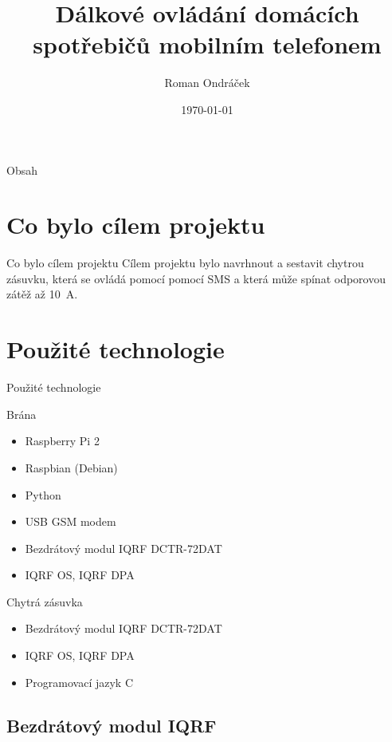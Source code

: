 \documentclass[11pt]{beamer}
\author{Roman Ondráček}
\title[Dálkové ovládání domácích spotřebičů]{Dálkové ovládání domácích spotřebičů mobilním telefonem}
\institute[]{Gymnázium Boskovice}
\date{\today}
\begin{document}
\begin{frame}
\titlepage
\end{frame}

\begin{frame}{Obsah}
\tableofcontents
\end{frame}

\section{Co bylo cílem projektu}

\begin{frame}{Co bylo cílem projektu}
Cílem projektu bylo navrhnout a sestavit chytrou zásuvku, která se ovládá pomocí pomocí SMS a která může spínat odporovou zátěž až 10~A.
\end{frame}

\section{Použité technologie}

\begin{frame}{Použité technologie}
  \begin{exampleblock}{Brána}
    \begin{itemize}
      \item Raspberry Pi 2
      \item Raspbian (Debian)
      \item Python
      \item USB GSM modem
      \item Bezdrátový modul IQRF DCTR-72DAT
      \item IQRF OS, IQRF DPA
    \end{itemize}
  \end{exampleblock}
  \begin{alertblock}{Chytrá zásuvka}
    \begin{itemize}
      \item Bezdrátový modul IQRF DCTR-72DAT
      \item IQRF OS, IQRF DPA
      \item Programovací jazyk C
    \end{itemize}
  \end{alertblock}
\end{frame}

\subsection{Bezdrátový modul IQRF}
\end{document}
